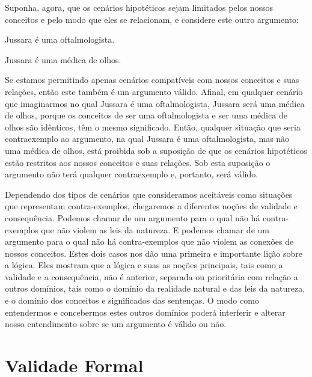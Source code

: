 Suponha, agora, que os cenários hipotéticos sejam limitados pelos nossos conceitos e pelo modo que eles se relacionam, e considere este outro argumento:
	\begin{earg}
		\item[] Jussara é uma oftalmologista.
		\item[\therefore] Jussara é uma médica de olhos.
	\end{earg}
Se estamos permitindo apenas cenários compatíveis com nossos conceitos e suas relações, então este também é um argumento válido.
Afinal, em qualquer cenário que imaginarmos no qual Jussara é uma oftalmologista, Jussara será uma médica de olhos, porque os conceitos de ser uma oftalmologista e ser uma médica de olhos são idênticos, têm o mesmo significado.
Então, qualquer situação que seria contraexemplo ao argumento, na qual Jussara é uma oftalmologista, mas não uma médica de olhos, está proibida sob a suposição de que os cenários hipotéticos estão restritos aos nossos conceitos e suas relações.
Sob esta suposição o argumento não terá qualquer contraexemplo e, portanto, será válido.

Dependendo dos tipos de cenários que consideramos aceitáveis como situações que representam contra-exemplos, chegaremos a diferentes noções de validade e consequência.
Podemos chamar de  um argumento para o qual não há contra-exemplos que não violem as leis da natureza.
E podemos chamar de  um argumento para o qual não há contra-exemplos que não violem as conexões de nossos conceitos.
Estes dois casos nos dão uma primeira e importante lição sobre a lógica.
Eles mostram que a lógica e suas as noções principais, tais como a validade e a consequência, não é anterior, separada ou prioritária com relação a outros domínios, tais como o domínio da realidade natural e das leis da natureza, e o domínio dos conceitos e significados das sentenças.
O modo como entendermos e concebermos estes outros domínios poderá interferir e alterar nosso entendimento sobre se um argumento é válido ou não.


\section{Validade Formal}\label{s:ValidityInVirtueOfForm}


